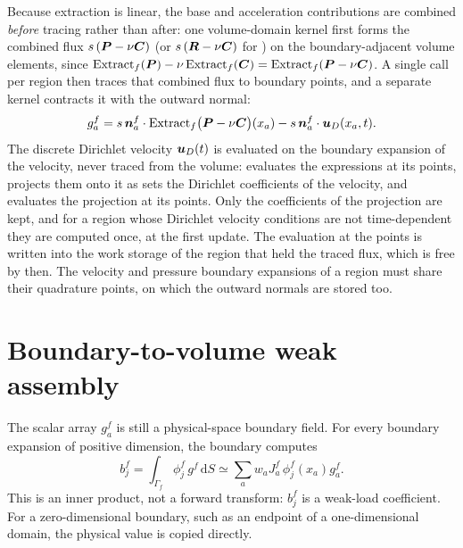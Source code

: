 Because extraction is linear, the base and acceleration contributions are
combined \emph{before} tracing rather than after: one volume-domain kernel
first forms the combined flux \(s\,(\boldsymbol{P}-\nu\boldsymbol{C})\) (or
\(s\,(\boldsymbol{R}-\nu\boldsymbol{C})\) for ) on the
boundary-adjacent volume elements, since
\(\mathrm{Extract}_f(\boldsymbol{P})-\nu\,\mathrm{Extract}_f(\boldsymbol{C})
=\mathrm{Extract}_f(\boldsymbol{P}-\nu\boldsymbol{C})\). A single
 call per region then traces that
combined flux to boundary points, and a separate kernel contracts it with the
outward normal:
\begin{equation}
  g^f_a
  =s\,\boldsymbol{n}^f_a\cdot
   \mathrm{Extract}_f\bigl(\boldsymbol{P}-\nu\boldsymbol{C}\bigr)(x_a)
   -s\,\boldsymbol{n}^f_a\cdot\boldsymbol{u}_D(x_a,t).
  \label{hopbc:eq:pointwise-kernel}
\end{equation}
The discrete Dirichlet velocity \(\boldsymbol{u}_D(t)\) is evaluated on the boundary
expansion of the velocity, never traced from the volume: 
evaluates the expressions at its points,  projects them
onto it as  sets the Dirichlet coefficients of the
velocity, and  evaluates the projection at its points. Only
the coefficients of the projection are kept, and for a region whose Dirichlet
velocity conditions are not time-dependent they are computed once, at the
first update. The evaluation at the points is written into the work storage
of the region that held the traced flux, which is free by then. The velocity
and pressure
boundary expansions of a region must share their quadrature points, on which
the outward normals are stored too.

\section{Boundary-to-volume weak assembly}

The scalar array \(g^f_a\) is still a physical-space boundary field.  For
every boundary expansion of positive dimension, the boundary
 computes
\begin{equation}
  b^f_j
  =\int_{\Gamma_f}\phi^f_j\,g^f\,\mathrm dS
  \simeq
   \sum_a w_a J^f_a\,\phi^f_j(x_a)g^f_a.
  \label{hopbc:eq:boundary-iproduct}
\end{equation}
This is an inner product, not a forward transform: \(b^f_j\) is a weak-load
coefficient.  For a zero-dimensional boundary, such as an endpoint of a
one-dimensional domain, the physical value is copied directly.

